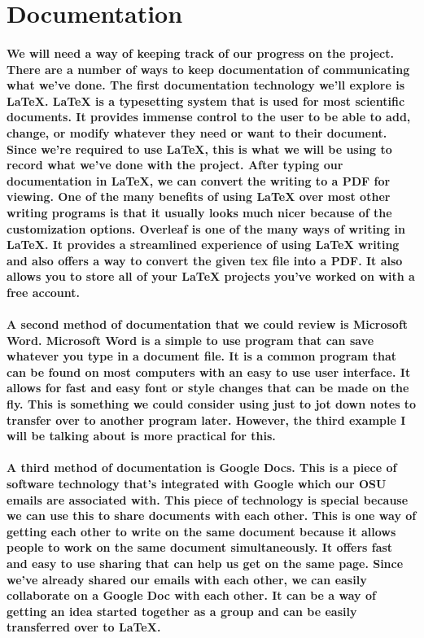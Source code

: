 \documentclass[letterpaper, 10pt, draftclsnofoot, onecolumn, IEEETran]{article}
\begin{document}
\section*{Documentation}
\paragraph{We will need a way of keeping track of our progress on the project. There are a number of ways to keep documentation of communicating what we've done. The first documentation technology we'll explore is LaTeX. LaTeX is a typesetting system that is used for most scientific documents. It provides immense control to the user to be able to add, change, or modify whatever they need or want to their document. Since we're required to use LaTeX, this is what we will be using to record what we've done with the project. After typing our documentation in LaTeX, we can convert the writing to a PDF for viewing. One of the many benefits of using LaTeX over most other writing programs is that it usually looks much nicer because of the customization options. Overleaf is one of the many ways of writing in LaTeX. It provides a streamlined experience of using LaTeX writing and also offers a way to convert the given tex file into a PDF. It also allows you to store all of your LaTeX projects you've worked on with a free account.}

\paragraph{A second method of documentation that we could review is Microsoft Word. Microsoft Word is a simple to use program that can save whatever you type in a document file. It is a common program that can be found on most computers with an easy to use user interface. It allows for fast and easy font or style changes that can be made on the fly. This is something we could consider using just to jot down notes to transfer over to another program later. However, the third example I will be talking about is more practical for this.}

\paragraph{A third method of documentation is Google Docs. This is a piece of software technology that's integrated with Google which our OSU emails are associated with. This piece of technology is special because we can use this to share documents with each other. This is one way of getting each other to write on the same document because it allows people to work on the same document simultaneously. It offers fast and easy to use sharing that can help us get on the same page. Since we've already shared our emails with each other, we can easily collaborate on a Google Doc with each other. It can be a way of getting an idea started together as a group and can be easily transferred over to LaTeX.}
\end{document}
